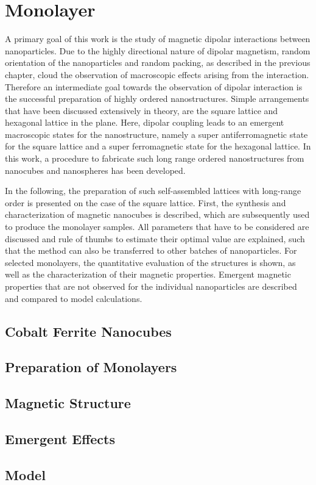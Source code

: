 \documentclass[\main/dresen_thesis.tex]{subfiles}
\renewcommand{\thisPath}{\main/chapters/monolayers}
\begin{document}
  \chapter{Monolayer}\label{ch:monolayers}
    A primary goal of this work is the study of magnetic dipolar interactions between nanoparticles.
    Due to the highly directional nature of dipolar magnetism, random orientation of the nanoparticles and random packing, as described in the previous chapter, cloud the observation of macroscopic effects arising from the interaction.
    Therefore an intermediate goal towards the observation of dipolar interaction is the successful preparation of highly ordered nanostructures.
    Simple arrangements that have been discussed extensively in theory, are the square lattice and hexagonal lattice in the plane.
    Here, dipolar coupling leads to an emergent macroscopic states for the nanostructure, namely a super antiferromagnetic state for the square lattice and a super ferromagnetic state for the hexagonal lattice.
    In this work, a procedure to fabricate such long range ordered nanostructures from nanocubes and nanospheres has been developed.

    In the following, the preparation of such self-assembled lattices with long-range order is presented on the case of the square lattice.
    First, the synthesis and characterization of magnetic nanocubes is described, which are subsequently used to produce the monolayer samples.
    All parameters that have to be considered are discussed and rule of thumbs to estimate their optimal value are explained, such that the method can also be transferred to other batches of nanoparticles.
    For selected monolayers, the quantitative evaluation of the structures is shown, as well as the characterization of their magnetic properties. Emergent magnetic properties that are not observed for the individual nanoparticles are described and compared to model calculations.

    \section{Cobalt Ferrite Nanocubes}
      

    \section{Preparation of Monolayers}
      

    \section{Magnetic Structure}

    \section{Emergent Effects}

    \section{Model}
\end{document}
